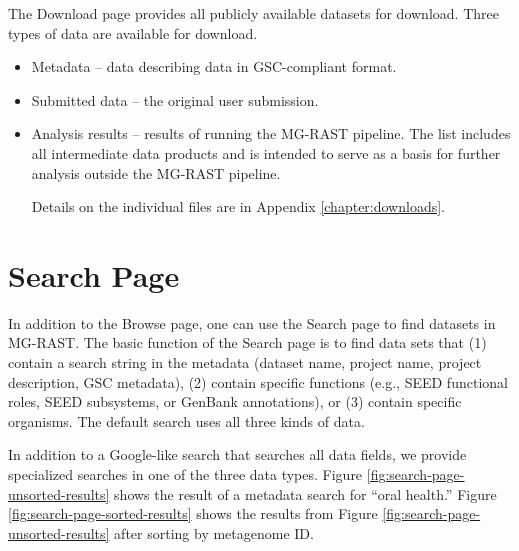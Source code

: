 \documentclass[12pt,fullpage]{report}
\begin{document}
The Download page provides all publicly available datasets for download.
Three types of data are available for download.

\begin{itemize}
\item Metadata --
data describing data in GSC-compliant format.

\item Submitted data --
the original user submission.

\item Analysis results --
results of running the MG-RAST pipeline. The list includes all intermediate data products and is intended to serve as a basis for further analysis outside the MG-RAST pipeline.

Details on the individual files are in Appendix \ref{chapter:downloads}.
\end{itemize}
\section{Search Page}
\label{section:search-page}

In addition to the Browse page, one can use
the Search page to find datasets in MG-RAST.
The basic function of the Search page is to find data sets that (1) contain a search string in the metadata (dataset name, project name, project description, GSC metadata), (2) contain specific functions (e.g., SEED functional roles, SEED subsystems, or GenBank annotations), or (3) contain specific organisms. The default search uses all three kinds of data.

In addition to a Google-like search that searches all data fields, we provide specialized searches in one of the three data types. Figure
\ref{fig:search-page-unsorted-results} shows the result of a metadata search for ``oral health.''
Figure \ref{fig:search-page-sorted-results} shows the results from Figure \ref{fig:search-page-unsorted-results} after sorting by metagenome ID.
\end{document}
